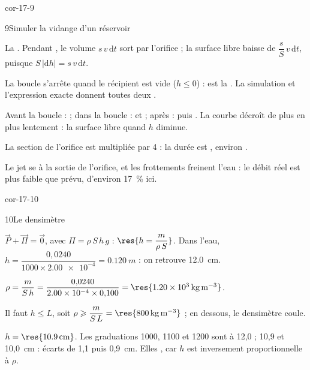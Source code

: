 \begin{blocLivre}{cor-17-9}
\begin{corrige}{9}{Simuler la vidange d'un réservoir}
\begin{questions}
\item La . Pendant , le volume $s\,v\,\mathrm{d}t$ sort par l'orifice ; la surface
libre baisse de $\dfrac{s}{S}\,v\,\mathrm{d}t$, puisque $S\,|\mathrm{d}h|=s\,v\,\mathrm{d}t$.
\item La boucle s'arrête quand le récipient est vide ($h\leqslant0$) :  est la . La
simulation et l'expression exacte donnent toutes deux .
\item Avant la boucle :  ; dans la boucle :  et
 ; après :  puis . La courbe décroît de
plus en plus lentement : la surface libre  quand $h$ diminue.
\item La section de l'orifice est multipliée par 4 : la durée est , environ .
\item Le jet se  à la sortie de l'orifice, et les frottements freinent l'eau : le débit réel est
plus faible que prévu, d'environ 17~\% ici.
\end{questions}
\end{corrige}
\end{blocLivre}
\begin{blocLivre}{cor-17-10}
\begin{corrige}{10}{Le densimètre}
\begin{questions}
\item $\vec{P}+\vec{\Pi}=\vec{0}$, avec $\Pi=\rho\,S\,h\,g$ : $\res{h=\dfrac{m}{\rho\,S}}$. Dans l'eau,
$h=\dfrac{0{,}0240}{1000\times\num{2.00e-4}}=\qty{0,120}{m}$ : on retrouve \qty{12,0}{cm}.
\item $\rho=\dfrac{m}{S\,h}=\dfrac{0{,}0240}{\num{2.00e-4}\times0{,}100}=\res{\qty{1,20e3}{kg.m^{-3}}}$.
\item Il faut $h\leqslant L$, soit $\rho\geqslant\dfrac{m}{S\,L}=\res{\qty{800}{kg.m^{-3}}}$ ; en dessous, le densimètre coule.
\item $h=\res{\qty{10,9}{cm}}$. Les graduations 1000, 1100 et 1200 sont à 12,0 ; 10,9 et 10,0~cm : écarts de 1,1 puis
0,9~cm. Elles , car $h$ est inversement proportionnelle à $\rho$.
\end{questions}
\end{corrige}
\end{blocLivre}
